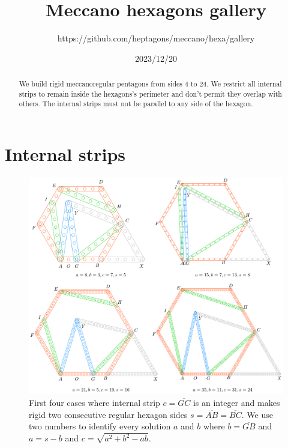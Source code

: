 \documentclass[11pt]{article}
\title{Meccano hexagons gallery}
\author{https://github.com/heptagons/meccano/hexa/gallery}
\date{2023/12/20}
\begin{document}
\maketitle
\begin{abstract}
We build rigid meccano\meccanoref regular pentagons from sides $4$ to $24$. We restrict all internal strips to remain inside the hexagons's perimeter and don't permit they overlap with others. The internal strips must not be parallel to any side of the hexagon.
\end{abstract}


\section{Internal strips}

\begin{figure}[h]
\centering
\includegraphics[scale=0.9]{build/hexa-builder-a}
\caption{First four cases where internal strip $c = \overline{GC}$ is an integer and makes rigid two consecutive regular hexagon sides $s = \overline{AB} = \overline{BC}$. We use two numbers to identify every solution $a$ and $b$ where $b = \overline{GB}$ and $a = s - b$ and $c = \sqrt{a^2+b^2-ab}$. }
\label{fig:builder-a}
\end{figure}
\end{document}
